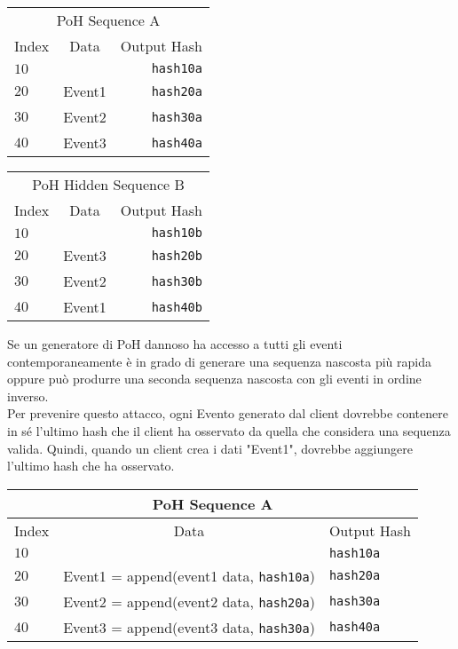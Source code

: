\documentclass[12pt]{article}
\begin{document}
\begin{center}
  \begin{tabular}{ | l c r |}
    \hline
    \multicolumn{3}{|c|}{PoH Sequence A} \\
    Index & Data & Output Hash  \\ \hline
    $10$ & & \texttt{hash10a} \\
    $20$ & Event1 & \texttt{hash20a} \\
    $30$ & Event2 & \texttt{hash30a} \\
    $40$ & Event3 & \texttt{hash40a} \\
    \hline
    \end{tabular}
  \begin{tabular}{ | l c r |}
    \hline
    \multicolumn{3}{|c|}{PoH Hidden Sequence B} \\
    Index & Data & Output Hash \\ \hline
    $10$ & & \texttt{hash10b}\\
    $20$ & Event3 & \texttt{hash20b}  \\
    $30$ & Event2 & \texttt{hash30b} \\
    $40$ & Event1 & \texttt{hash40b} \\
    \hline
    \end{tabular}
\end{center}

Se un generatore di PoH dannoso ha accesso a tutti gli eventi contemporaneamente è in grado di generare una sequenza nascosta più rapida oppure può produrre una seconda sequenza nascosta con gli eventi in ordine inverso.\\

Per prevenire questo attacco, ogni Evento generato dal client dovrebbe contenere in sé l'ultimo hash che il client ha osservato da quella che considera una sequenza valida. Quindi, quando un client crea i dati "Event1", dovrebbe aggiungere l'ultimo hash che ha osservato.\\

\begin{center}
  \begin{tabular}{  l  c l}

    \multicolumn{3}{c}{PoH Sequence A} \\
    \hline
    Index  & Data & Output Hash  \\ \hline
    $10$ & & \texttt{hash10a} \\
    $20$ & Event1 = append(event1 data, \texttt{hash10a}) & \texttt{hash20a}  \\
    $30$ & Event2 = append(event2 data, \texttt{hash20a}) & \texttt{hash30a} \\
    $40$ &  Event3 = append(event3 data, \texttt{hash30a}) & \texttt{hash40a} \\
    \end{tabular}
\end{center}
\end{document}
